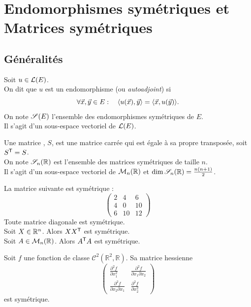 \documentclass{book}
\begin{document}
\section{Endomorphismes symétriques et Matrices symétriques}
\subsection{Généralités}
\begin{Definition}
Soit $u\in \mathcal{L}(E)$.\\
On dit que $u$ est un endomorphisme  (ou \emph{autoadjoint}) si 
$$\forall \vec{x},\vec{y}\in E:\quad \langle u(\vec{x}),\vec{y}\rangle = \langle\vec{x},u(\vec{y})\rangle.$$
On note $\mathscr{S}(E)$ l'ensemble des endomorphismes symétriques de $E$.\\
Il s'agit d'un sous-espace vectoriel de $\mathcal{L}(E)$.
\end{Definition}
\begin{Definition}
Une matrice , $S$, est une matrice carrée qui est égale à sa propre transposée, soit $S^{\mathsf {T}}=S$.\\
On note $\mathscr{S}_n(\mathbb{R})$ est l'ensemble des matrices symétriques de taille $n$.\\
Il s'agit d'un sous-espace vectoriel de $\mathcal{M}_{n}(\mathbb{R})$ et $\dim \mathscr{S}_n(\mathbb{R})=  \frac{n(n+1)}{2}$.
\end{Definition}



\begin{Exemple}La matrice suivante est  symétrique :
$$\begin{pmatrix}2&4&6\\4&0&10\\6&10&12\end{pmatrix}$$
Toute matrice diagonale est symétrique.\\
Soit $X\in \mathbb{R}^n$. Alors $X  X^{\mathsf {T}}$ est symétrique.\\
Soit $A\in \mathcal{M}_{n}(\mathbb{R})$. Alors $A^{\mathsf {T}} A$ est symétrique.\\
\end{Exemple}
\begin{Exemple}
Soit $f$ une fonction de classe $\mathcal {C}^{2}(\mathbb{R}^2,\mathbb{R})$. Sa matrice hessienne $$\begin{pmatrix}\frac {\partial ^{2}f}{\partial x_{1}^{2}}&\frac {\partial ^{2}f}{\partial x_{1}\partial x_{2}}\\\frac {\partial ^{2}f}{\partial x_{2}\partial x_{1}}&\frac {\partial ^{2}f}{\partial x_{2}^{2}}\end{pmatrix}$$ est symétrique.
\end{Exemple}
\end{document}
